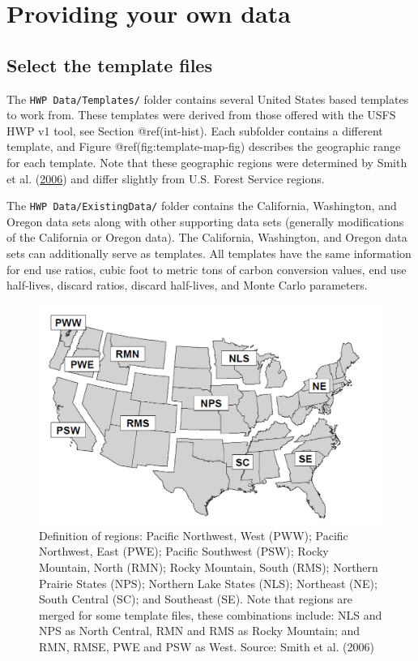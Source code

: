 \documentclass[
  openany]{book}
\begin{document}
\hypertarget{own-prov}{%
\section{Providing your own data}\label{own-prov}}

\hypertarget{own-prov-temp}{%
\subsection{Select the template files}\label{own-prov-temp}}

The \texttt{HWP\ Data/Templates/} folder contains several United States
based templates to work from. These templates were derived from those
offered with the USFS HWP v1 tool, see Section @ref(int-hist). Each
subfolder contains a different template, and Figure
@ref(fig:template-map-fig) describes the geographic range for each
template. Note that these geographic regions were determined by Smith et
al. (\protect\hyperlink{ref-smith2006}{2006}) and differ slightly from
U.S. Forest Service regions.

The \texttt{HWP\ Data/ExistingData/} folder contains the California,
Washington, and Oregon data sets along with other supporting data sets
(generally modifications of the California or Oregon data). The
California, Washington, and Oregon data sets can additionally serve as
templates. All templates have the same information for end use ratios,
cubic foot to metric tons of carbon conversion values, end use
half-lives, discard ratios, discard half-lives, and Monte Carlo
parameters.

\begin{figure}
\includegraphics[width=1\linewidth]{images/regions_map} \caption{Definition of regions: Pacific Northwest, West (PWW); Pacific Northwest, East (PWE); Pacific Southwest (PSW); Rocky Mountain, North (RMN); Rocky Mountain, South (RMS); Northern Prairie States (NPS); Northern Lake States (NLS); Northeast (NE); South Central (SC); and Southeast (SE).  Note that regions are merged for some template files, these combinations include: NLS and NPS as North Central, RMN and RMS as Rocky Mountain; and RMN, RMSE, PWE and PSW as West. Source: Smith et al. (2006)}\label{fig:template-map-fig}
\end{figure}
\end{document}
